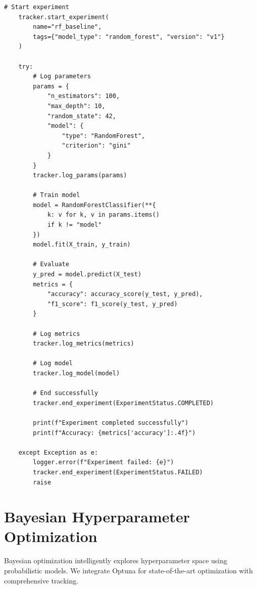 \begin{lstlisting}[style=python, caption={Experiment tracking with MLflow integration}]
    # Start experiment
    tracker.start_experiment(
        name="rf_baseline",
        tags={"model_type": "random_forest", "version": "v1"}
    )

    try:
        # Log parameters
        params = {
            "n_estimators": 100,
            "max_depth": 10,
            "random_state": 42,
            "model": {
                "type": "RandomForest",
                "criterion": "gini"
            }
        }
        tracker.log_params(params)

        # Train model
        model = RandomForestClassifier(**{
            k: v for k, v in params.items()
            if k != "model"
        })
        model.fit(X_train, y_train)

        # Evaluate
        y_pred = model.predict(X_test)
        metrics = {
            "accuracy": accuracy_score(y_test, y_pred),
            "f1_score": f1_score(y_test, y_pred)
        }

        # Log metrics
        tracker.log_metrics(metrics)

        # Log model
        tracker.log_model(model)

        # End successfully
        tracker.end_experiment(ExperimentStatus.COMPLETED)

        print(f"Experiment completed successfully")
        print(f"Accuracy: {metrics['accuracy']:.4f}")

    except Exception as e:
        logger.error(f"Experiment failed: {e}")
        tracker.end_experiment(ExperimentStatus.FAILED)
        raise
\end{lstlisting}

\section{Bayesian Hyperparameter Optimization}

Bayesian optimization intelligently explores hyperparameter space using probabilistic models. We integrate Optuna for state-of-the-art optimization with comprehensive tracking.


